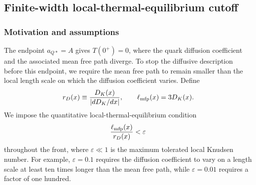 \subsection{Finite-width local-thermal-equilibrium cutoff}
\label{sec:finite-width-lte-cutoff}

\subsubsection{Motivation and assumptions}

The endpoint \(a_{Q*}=A\) gives \(T(0^+)=0\), where the quark diffusion
coefficient and the associated mean free path diverge.  To stop the diffusive
description before this endpoint, we require the mean free path to remain
smaller than the local length scale on which the diffusion coefficient varies.
Define
\begin{equation}
r_D(x)
\equiv
\frac{D_K(x)}{|dD_K/dx|},
\qquad
\ell_{\rm mfp}(x)=3D_K(x).
\end{equation}
We impose the quantitative local-thermal-equilibrium condition
\begin{equation}
\frac{\ell_{\rm mfp}(x)}{r_D(x)}<\varepsilon
\end{equation}
throughout the front, where \(\varepsilon\ll1\) is the maximum tolerated local
Knudsen number.  For example, \(\varepsilon=0.1\) requires the diffusion
coefficient to vary on a length scale at least ten times longer than the mean
free path, while \(\varepsilon=0.01\) requires a factor of one hundred.

